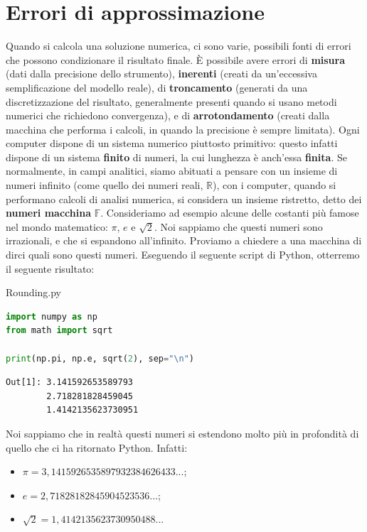 \section{Errori di approssimazione}

Quando si calcola una soluzione numerica, ci sono varie, possibili fonti di errori che possono condizionare il risultato finale. È possibile avere errori di \textbf{misura} (dati dalla precisione dello strumento), \textbf{inerenti} (creati da un'eccessiva semplificazione del modello reale), di \textbf{troncamento} (generati da una discretizzazione del risultato, generalmente presenti quando si usano metodi numerici che richiedono convergenza), e di \textbf{arrotondamento} (creati dalla macchina che performa i calcoli, in quando la precisione è sempre limitata).
\nwl
Ogni computer dispone di un sistema numerico piuttosto primitivo: questo infatti dispone di un sistema \textbf{finito} di numeri, la cui lunghezza è anch'essa \textbf{finita}. Se normalmente, in campi analitici, siamo abituati a pensare con un insieme di numeri infinito (come quello dei numeri reali, $\mathbb{R}$), con i computer, quando si performano calcoli di analisi numerica, si considera un insieme ristretto, detto dei \textbf{numeri macchina} $\mathbb{F}$. Consideriamo ad esempio alcune delle costanti più famose nel mondo matematico: $\pi$, $e$ e $\sqrt{2}$. Noi sappiamo che questi numeri sono irrazionali, e che si espandono all'infinito. Proviamo a chiedere a una macchina di dirci quali sono questi numeri. Eseguendo il seguente script di Python, otterremo il seguente risultato:

\begin{codeblock}{Rounding.py}
    \begin{lstlisting}[language = Python]
import numpy as np
from math import sqrt

print(np.pi, np.e, sqrt(2), sep="\n")\end{lstlisting}
    \vspace{11pt}
    \begin{tcolorbox}[colback = black!95!Periwinkle!90]
        \begin{lstlisting}[style = notexterm]
Out[1]: 3.141592653589793
        2.718281828459045
        1.4142135623730951\end{lstlisting}
    \end{tcolorbox}
\end{codeblock}

Noi sappiamo che in realtà questi numeri si estendono molto più in profondità di quello che ci ha ritornato Python. Infatti:
\begin{itemize}
    \item $\pi = 3,1415926535897932384626433...$;
    \item $e = 2,71828182845904523536...$;
    \item $\sqrt{2} = 1,4142135623730950488...$
\end{itemize}

